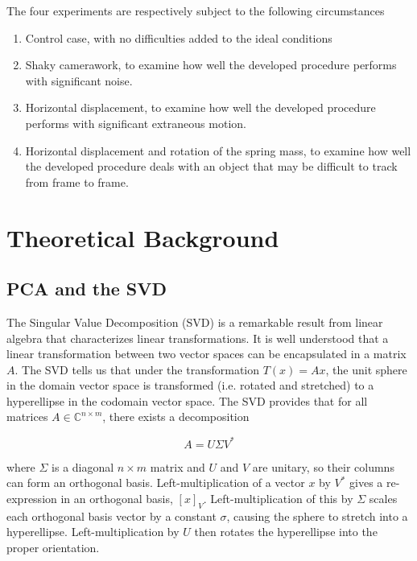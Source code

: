 \documentclass{article}
\begin{document}
The four experiments are respectively subject to the following circumstances

\begin{enumerate}
	\item Control case, with no difficulties added to the ideal conditions
	
	\item Shaky camerawork, to examine how well the developed procedure performs with significant noise.
	
	\item Horizontal displacement, to examine how well the developed procedure performs with significant extraneous motion.
	
	\item Horizontal displacement and rotation of the spring mass, to examine how well the developed procedure deals with an object that may be difficult to track from frame to frame.
\end{enumerate}


\section{Theoretical Background}
\subsection{PCA and the SVD}

The Singular Value Decomposition (SVD) is a remarkable result from linear algebra that characterizes linear transformations. It is well understood that a linear transformation between two vector spaces can be encapsulated in a matrix $A$. The SVD tells us that under the transformation $T(x)=Ax$, the unit sphere in the domain vector space is transformed (i.e. rotated and stretched) to a hyperellipse in the codomain vector space. The SVD provides that for all matrices $A \in \mathbb{C}^{n\times m}$, there exists a decomposition

\begin{equation}
	A = U \Sigma V^*
	\label{eqn:svd}
\end{equation}

where $\Sigma$ is a diagonal $n \times m$ matrix and $U$ and $V$ are unitary, so their columns can form an orthogonal basis. Left-multiplication of a vector $x$ by $V^*$ gives a re-expression in an orthogonal basis, $[x]_V$. Left-multiplication of this by $\Sigma$ scales each orthogonal basis vector by a constant $\sigma$, causing the sphere to stretch into a hyperellipse. Left-multiplication by $U$ then rotates the hyperellipse into the proper orientation.
\end{document}
